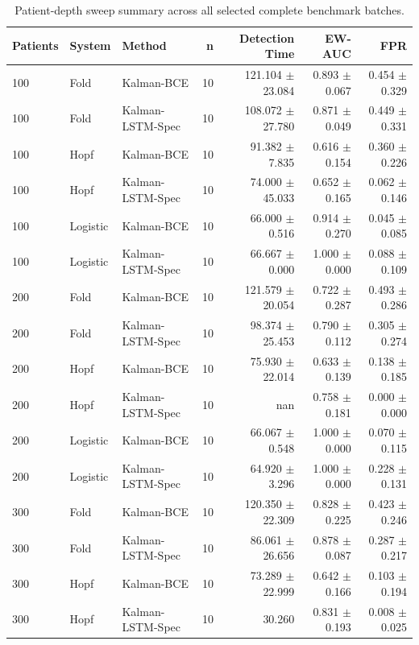 \begin{table}[htbp]
  \centering
  \caption{Patient-depth sweep summary across all selected complete benchmark batches.}
  \label{tab:benchmark_sweep}
  \begin{tabular}{lllrrrr}
    \toprule
    Patients & System & Method & n & Detection Time & EW-AUC & FPR \\
    \midrule
    100 & Fold & Kalman-BCE & 10 & 121.104 $\pm$ 23.084 & 0.893 $\pm$ 0.067 & 0.454 $\pm$ 0.329 \\
    100 & Fold & Kalman-LSTM-Spec & 10 & 108.072 $\pm$ 27.780 & 0.871 $\pm$ 0.049 & 0.449 $\pm$ 0.331 \\
    100 & Hopf & Kalman-BCE & 10 & 91.382 $\pm$ 7.835 & 0.616 $\pm$ 0.154 & 0.360 $\pm$ 0.226 \\
    100 & Hopf & Kalman-LSTM-Spec & 10 & 74.000 $\pm$ 45.033 & 0.652 $\pm$ 0.165 & 0.062 $\pm$ 0.146 \\
    100 & Logistic & Kalman-BCE & 10 & 66.000 $\pm$ 0.516 & 0.914 $\pm$ 0.270 & 0.045 $\pm$ 0.085 \\
    100 & Logistic & Kalman-LSTM-Spec & 10 & 66.667 $\pm$ 0.000 & 1.000 $\pm$ 0.000 & 0.088 $\pm$ 0.109 \\
    200 & Fold & Kalman-BCE & 10 & 121.579 $\pm$ 20.054 & 0.722 $\pm$ 0.287 & 0.493 $\pm$ 0.286 \\
    200 & Fold & Kalman-LSTM-Spec & 10 & 98.374 $\pm$ 25.453 & 0.790 $\pm$ 0.112 & 0.305 $\pm$ 0.274 \\
    200 & Hopf & Kalman-BCE & 10 & 75.930 $\pm$ 22.014 & 0.633 $\pm$ 0.139 & 0.138 $\pm$ 0.185 \\
    200 & Hopf & Kalman-LSTM-Spec & 10 & nan & 0.758 $\pm$ 0.181 & 0.000 $\pm$ 0.000 \\
    200 & Logistic & Kalman-BCE & 10 & 66.067 $\pm$ 0.548 & 1.000 $\pm$ 0.000 & 0.070 $\pm$ 0.115 \\
    200 & Logistic & Kalman-LSTM-Spec & 10 & 64.920 $\pm$ 3.296 & 1.000 $\pm$ 0.000 & 0.228 $\pm$ 0.131 \\
    300 & Fold & Kalman-BCE & 10 & 120.350 $\pm$ 22.309 & 0.828 $\pm$ 0.225 & 0.423 $\pm$ 0.246 \\
    300 & Fold & Kalman-LSTM-Spec & 10 & 86.061 $\pm$ 26.656 & 0.878 $\pm$ 0.087 & 0.287 $\pm$ 0.217 \\
    300 & Hopf & Kalman-BCE & 10 & 73.289 $\pm$ 22.999 & 0.642 $\pm$ 0.166 & 0.103 $\pm$ 0.194 \\
    300 & Hopf & Kalman-LSTM-Spec & 10 & 30.260 & 0.831 $\pm$ 0.193 & 0.008 $\pm$ 0.025 \\

\end{tabular}
\end{table}
